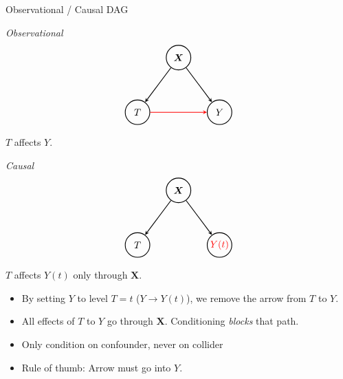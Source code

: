 \documentclass[10pt]{beamer}
\theoremstyle{plain}
\newcommand{\bX}{\bm{X}}
\begin{document}
\begin{frame}{Observational / Causal DAG}
    \begin{center}
\begin{minipage}{0.47\linewidth}
\centering
\textit{Observational}
\[
\begin{tikzpicture}[
    >=stealth,
    line width=0.8pt,
    every node/.style={circle, draw, minimum size=9mm, inner sep=0pt}
]
  \node (T) at (1,0)      {$T$};
  \node (Y) at (4,0)    {$Y$};
  \node (X) at (2.5, 2) {$\bX$};

  \draw[->] (X) -- (Y);
  \draw[->] (X) -- (T);
  \draw[->, red] (T) -- (Y);
\end{tikzpicture}
\]
$T$ affects $Y$.
\end{minipage}\hfill
\begin{minipage}{0.47\linewidth}
\centering
\textit{Causal}
\[
\begin{tikzpicture}[
    >=stealth,
    line width=0.8pt,
    every node/.style={circle, draw, minimum size=9mm, inner sep=0pt}
]
  \node (T) at (1,0)      {$T$};
  \node (Y) at (4,0)    {\textcolor{red}{$Y(t)$}};
  \node (X) at (2.5, 2) {$\bX$};

  \draw[->] (X) -- (Y);
  \draw[->] (X) -- (T);
\end{tikzpicture}
\]
$T$ affects $Y(t)$ only through $\bX$.
\end{minipage}
\end{center}
\vspace{0.5em}
\begin{itemize}
    \item By setting $Y$ to level $T = t$ ($Y \to Y(t)$), we remove the arrow from $T$ to $Y$.
    \item All effects of $T$ to $Y$ go through $\bX$.  Conditioning \emph{blocks} that path.
    \item Only condition on confounder, never on collider 
    \item Rule of thumb: Arrow must go into $Y$.
\end{itemize}
\end{frame}
\end{document}
